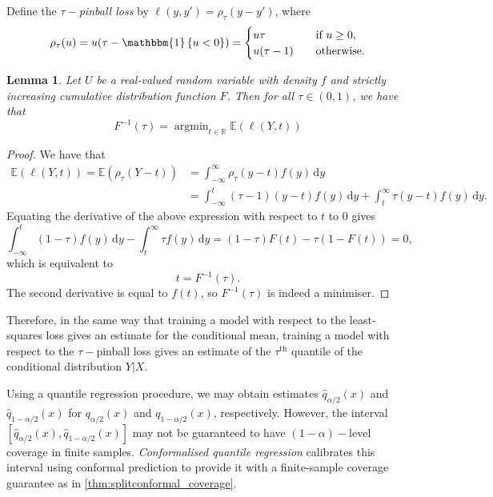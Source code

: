 \documentclass[11pt, titlepage]{article} %
\DeclareMathOperator*{\argmin}{argmin}
\newcommand{\R}{\mathrm}
\newcommand{\Exp}[3]{\mathbb{E}\left#2 #1 \right#3}
\newcommand{\Ind}[1]{\mathbbm{1}\left\{ #1 \right\}}
\numberwithin{equation}{section}
\newtheorem{lemma}{Lemma}
\theoremstyle{definition}
\numberwithin{theorem}{section}
\numberwithin{lemma}{section}
\numberwithin{corollary}{section}
\numberwithin{proposition}{section}
\numberwithin{definition}{section}
\numberwithin{remark}{section}
\begin{document}
\noindent
Define the \(\tau-\)\textit{pinball loss} by \(\ell(y, y') = \rho_\tau(y - y')\), where \[\rho_\tau(u) = u(\tau - \Ind{u < 0} ) = \begin{cases}
    u\tau &\quad \text{if } u \geq 0, \\
    u(\tau - 1) &\quad \text{otherwise.}
\end{cases}\]

\begin{lemma}
    Let \(U\) be a real-valued random variable with density \(f\) and strictly increasing cumulative distribution function \(F\). Then for all \(\tau \in (0,1)\), we have that \[F^{-1}(\tau) = \argmin_{t \in \mathbb{R}} \Exp{\ell(Y,t)}{(}{)}\] 
\end{lemma}
\begin{proof}
    We have that \begin{align*}
        \Exp{\ell(Y,t)}{(}{)} = \Exp{\rho_\tau(Y-t)}{(}{)} &= \int_{-\infty}^\infty \rho_\tau(y-t) f(y) \, \R{d}y \\
        &= \int_{-\infty}^t (\tau-1) (y-t) f(y) \, \R{d}y + \int_t^\infty \tau(y-t) f(y) \, \R{d}y.
    \end{align*}
    Equating the derivative of the above expression with respect to \(t\) to \(0\) gives \[\int_{-\infty}^t (1-\tau) f(y) \, \R{d}y - \int_t^\infty \tau f(y) \, \R{d}y = (1-\tau)F(t) - \tau(1-F(t))  =  0,\] which is equivalent to \[t = F^{-1}(\tau).\] The second derivative is equal to \(f(t)\), so \(F^{-1}(\tau)\) is indeed a minimiser.
\end{proof}

\noindent
Therefore, in the same way that training a model with respect to the least-squares loss gives an estimate for the conditional mean, training a model with respect to the \(\tau-\)pinball loss gives an estimate of the \(\tau^{\R{th}}\) quantile of the conditional distribution \(Y|X\). \vskip5pt

\noindent
Using a quantile regression procedure, we may obtain estimates \(\hat{q}_{\alpha/2}(x)\) and \(\hat{q}_{1-\alpha/2}(x)\) for \(q_{\alpha/2}(x)\) and \(q_{1-\alpha/2}(x)\), respectively. However, the interval \([\hat{q}_{\alpha/2}(x), \hat{q}_{1-\alpha/2}(x)]\) may not be guaranteed to have \((1-\alpha)-\)level coverage in finite samples. \textit{Conformalised quantile regression} \cite{romano2019_CQR} calibrates this interval using conformal prediction to provide it with a finite-sample coverage guarantee as in \cref{thm:splitconformal_coverage}. \vskip5pt
\end{document}
